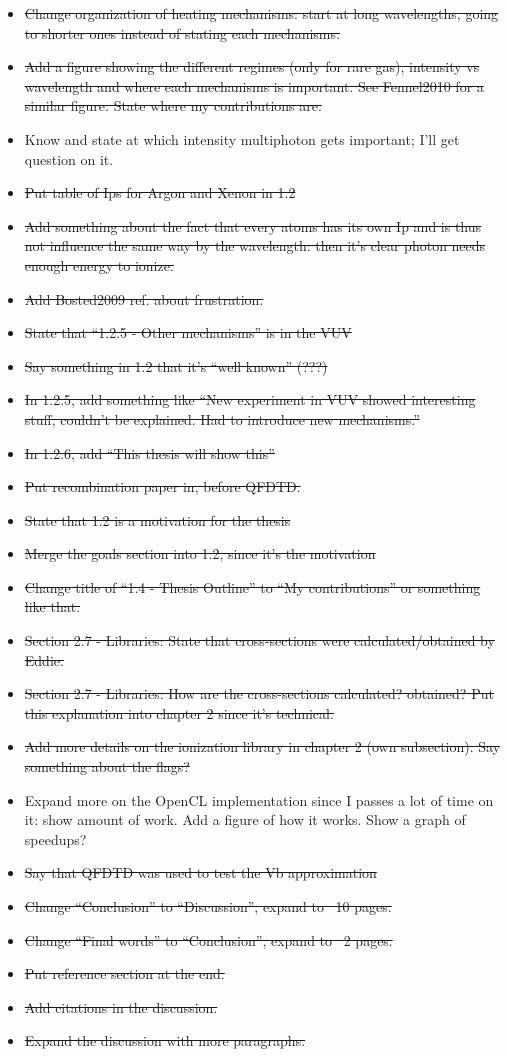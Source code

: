 \begin{itemize}
\item \sout{Change organization of heating mechanisms: start at long wavelengths, going
to shorter ones instead of stating each mechanisms.}
\item \sout{Add a figure showing the different regimes (only for rare gas), intensity
vs wavelength and where each mechanisms is important. See Fennel2010 for a
similar figure. State where my contributions are.}
\item Know and state at which intensity multiphoton gets important; I'll get
question on it.
\item \sout{Put table of Ips for Argon and Xenon in 1.2}
\item \sout{Add something about the fact that every atoms has its own Ip and is thus
not influence the same way by the wavelength: then it's clear photon needs
enough energy to ionize.}
\item \sout{Add Bosted2009 ref. about frustration.}
\item \sout{State that ``1.2.5 - Other mechanisms'' is in the VUV}
\item \sout{Say something in 1.2 that it's ``well known'' (???)}
\item \sout{In 1.2.5, add something like ``New experiment in VUV showed interesting
stuff, couldn't be explained. Had to introduce new mechanisms.''}
\item \sout{In 1.2.6, add ``This thesis will show this''}
\item \sout{Put recombination paper in, before QFDTD.}
\item \sout{State that 1.2 is a motivation for the thesis}
\item \sout{Merge the goals section into 1.2, since it's the motivation}
\item \sout{Change title of ``1.4 - Thesis Outline'' to ``My contributions'' or
something like that.}
\item \sout{Section 2.7 - Libraries: State that cross-sections were calculated/obtained
by Eddie.}
\item \sout{Section 2.7 - Libraries: How are the cross-sections calculated? obtained?
Put this explanation into chapter 2 since it's technical.}
\item \sout{Add more details on the ionization library in chapter 2 (own subsection).
Say something about the flags?}
\item Expand more on the OpenCL implementation since I passes a lot of time on
it: show amount of work. Add a figure of how it works. Show a graph of speedups?
\item \sout{Say that QFDTD was used to test the Vb approximation}
\item \sout{Change ``Conclusion'' to ``Discussion'', expand to ~10 pages.}
\item \sout{Change ``Final words'' to ``Conclusion'', expand to ~2 pages.}
\item \sout{Put reference section at the end.}
\item \sout{Add citations in the discussion.}
\item \sout{Expand the discussion with more paragraphs.}
\end{itemize}

